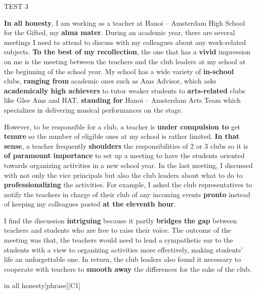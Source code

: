 \begin{glossarymc}[Cambridge 13]
\begin{test}{TEST 3}
\begin{qa}
    \textbf{In all honesty}, I am working as a teacher at Hanoi – Amsterdam High School for the Gifted, my \textbf{alma mater}. During an academic year, there are several meetings I need to attend to discuss with my colleagues about any work-related subjects. \textbf{To the best of my recollection}, the one that has a \textbf{vivid} impression on me is the meeting between the teachers and the club leaders at my school at the beginning of the school year. My school has a wide variety of \textbf{in-school} clubs, \textbf{ranging from} academic ones such as Ams Advisor, which asks \textbf{academically high achievers} to tutor weaker students to \textbf{arts-related} clubs like Glee Ams and HAT, \textbf{standing for} Hanoi – Amsterdam Arts Team which specializes in delivering musical performances on the stage. 

    However, to be responsible for a club, a teacher is \textbf{under compulsion to} get \textbf{tenure} so the number of eligible ones at my school is rather limited. \textbf{In that sense}, a teacher frequently \textbf{shoulders} the responsibilities of 2 or 3 clubs so it is \textbf{of paramount importance} to set up a meeting to have the students oriented towards organizing activities in a new school year. In the last meeting, I discussed with not only the vice principals but also the club leaders about what to do to \textbf{professionalizing} the activities. For example, I asked the club representatives to notify the teachers in charge of their club of any incoming events \textbf{pronto} instead of keeping my colleagues posted \textbf{at the eleventh hour}. 

    I find the discussion \textbf{intriguing} because it partly \textbf{bridges the gap} between teachers and students who are free to raise their voice. The outcome of the meeting was that, the teachers would need to lend a sympathetic ear to the students with a view to organizing activities more effectively, making students’ life an unforgettable one. In return, the club leaders also found it necessary to cooperate with teachers to \textbf{smooth away} the differences for the sake of the club.
    \end{qa}

        \begin{VocabExplain}[Part 2]
            \begin{ExplainCard}{in all honesty}[phrase][C1]
            \end{ExplainCard}


\end{VocabExplain}
\end{test}
\end{glossarymc}
